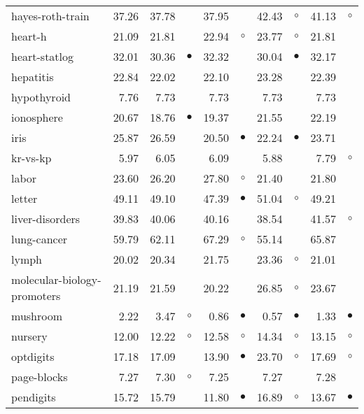 {\begin{longtable}{lrr@{\hspace{0.1cm}}cr@{\hspace{0.1cm}}cr@{\hspace{0.1cm}}cr@{\hspace{0.1cm}}c}
hayes-roth-train & 37.26 & 37.78 &           & 37.95 &           & 42.43 &   $\circ$ & 41.13 &   $\circ$\\
heart-h & 21.09 & 21.81 &           & 22.94 &   $\circ$ & 23.77 &   $\circ$ & 21.81 &          \\
heart-statlog & 32.01 & 30.36 & $\bullet$ & 32.32 &           & 30.04 & $\bullet$ & 32.17 &          \\
hepatitis & 22.84 & 22.02 &           & 22.10 &           & 23.28 &           & 22.39 &          \\
hypothyroid &  7.76 &  7.73 &           &  7.73 &           &  7.73 &           &  7.73 &          \\
ionosphere & 20.67 & 18.76 & $\bullet$ & 19.37 &           & 21.55 &           & 22.19 &          \\
iris & 25.87 & 26.59 &           & 20.50 & $\bullet$ & 22.24 & $\bullet$ & 23.71 &          \\
kr-vs-kp &  5.97 &  6.05 &           &  6.09 &           &  5.88 &           &  7.79 &   $\circ$\\
labor & 23.60 & 26.20 &           & 27.80 &   $\circ$ & 21.40 &           & 21.80 &          \\
letter & 49.11 & 49.10 &           & 47.39 & $\bullet$ & 51.04 &   $\circ$ & 49.21 &          \\
liver-disorders & 39.83 & 40.06 &           & 40.16 &           & 38.54 &           & 41.57 &   $\circ$\\
lung-cancer & 59.79 & 62.11 &           & 67.29 &   $\circ$ & 55.14 &           & 65.87 &          \\
lymph & 20.02 & 20.34 &           & 21.75 &           & 23.36 &   $\circ$ & 21.01 &          \\
molecular-biology-promoters & 21.19 & 21.59 &           & 20.22 &           & 26.85 &   $\circ$ & 23.67 &          \\
mushroom &  2.22 &  3.47 &   $\circ$ &  0.86 & $\bullet$ &  0.57 & $\bullet$ &  1.33 & $\bullet$\\
nursery & 12.00 & 12.22 &   $\circ$ & 12.58 &   $\circ$ & 14.34 &   $\circ$ & 13.15 &   $\circ$\\
optdigits & 17.18 & 17.09 &           & 13.90 & $\bullet$ & 23.70 &   $\circ$ & 17.69 &   $\circ$\\
page-blocks &  7.27 &  7.30 &   $\circ$ &  7.25 &           &  7.27 &           &  7.28 &          \\
pendigits & 15.72 & 15.79 &           & 11.80 & $\bullet$ & 16.89 &   $\circ$ & 13.67 & $\bullet$\\

\end{longtable}}
